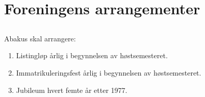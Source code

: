 \section{Foreningens arrangementer}

\subsection{}
Abakus skal arrangere:

\begin{enumerate}[label=\alph*)]
  \item Listingløp årlig i begynnelsen av høstsemesteret.
  \item Immatrikuleringsfest årlig i begynnelsen av høstsemesteret.
  \item Jubileum hvert femte år etter 1977.
\end{enumerate}

